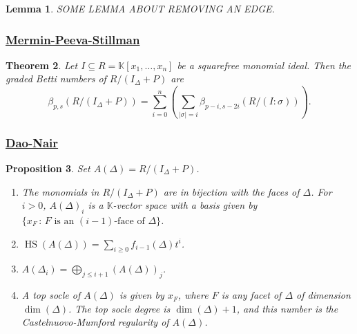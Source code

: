\documentclass[12pt,a4paper]{article}
\newcommand{\abs}[1]{\lvert {#1} \rvert}
\newcommand{\KK}{\mathbb{K}}
\DeclareMathOperator{\HS}{HS}
\newtheorem{theorem}{Theorem}[section]
\newtheorem{lemma}[theorem]{Lemma}
\newtheorem{proposition}[theorem]{Proposition}
\theoremstyle{definition}
\numberwithin{equation}{section}
\begin{document}
\begin{lemma}{\cite[Lemma 2.4]{migliore_weak_2020}}
    SOME LEMMA ABOUT REMOVING AN EDGE.
\end{lemma}


\subsubsection{\href{https://www.sciencedirect.com/science/article/pii/S000187080700299X}{Mermin-Peeva-Stillman}}
\begin{theorem}{\cite[Theorem 2.1(4)]{mermin_ideals_2008}}
    Let $I \subseteq R = \KK[x_1,\dots,x_n]$ be a squarefree monomial ideal.
    Then the graded Betti numbers of $R / (I_\Delta + P)$ are
    \begin{equation*}
        \beta_{p,s}\left( R / (I_\Delta + P) \right) = \sum_{i=0}^n \left( \sum_{\abs{\sigma} = i} \beta_{p-i, s-2i} \left( R / (I \colon \sigma) \right) \right).
    \end{equation*}
\end{theorem}


\subsubsection{\href{https://arxiv.org/abs/2112.09434}{Dao-Nair}}
\begin{proposition}{\cite[Proposition 2.2]{dao_lefschetz_2024}}
    Set $A(\Delta) = R / (I_\Delta + P)$.
    \begin{enumerate}[label=(\roman*)]
        \item The monomials in $R/(I_\Delta + P)$ are in bijection with the faces of $\Delta$.
        For $i > 0$, $A(\Delta)_i$ is a $\KK$-vector space with a basis given by $\{ x_F \, \colon \, F \text{ is an } (i-1)\text{-face of } \Delta \}$.

        \item $\displaystyle \HS(A(\Delta)) = \sum_{i \geq 0} f_{i-1}(\Delta) t^i$.

        \item $\displaystyle A(\Delta_i) = \bigoplus_{j \leq i+1} (A(\Delta))_j$.

        \item A top socle of $A(\Delta)$ is given by $x_F$, where $F$ is any facet of $\Delta$ of dimension $\dim(\Delta)$.
        The top socle degree is $\dim(\Delta) + 1$, and this number is the Castelnuovo-Mumford regularity of $A(\Delta)$.
    \end{enumerate}
\end{proposition}
\end{document}
